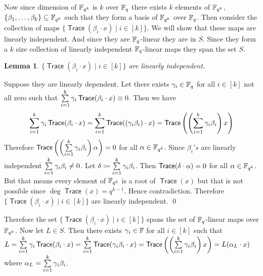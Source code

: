 \documentclass[a4paper, 11pt]{article}
\newtheorem{lemma}{Lemma}
\renewenvironment{proof}{\noindent{\it \textbf{Proof:}}\hspace*{1em}}{\qed\bigskip\\}
\DeclareMathOperator{\trac}{\textsf{Trace}}
\begin{document}
{\begin{enumerate}[label=(\alph*)]
Now since dimension of $\mathbb{F}_{q^k}$ is $k$ over $\mathbb{F}_q$ there exists $k $ elements of $\mathbb{F}_{q^k}$, $\{\beta_1,\dots, \beta_k\}\subseteq \mathbb{F}_{q^k}$ such that they form a basis of $\mathbb{F}_{q^k}$ over $\mathbb{F}_{q}$. Then consider the collection of maps $\{\trac(\beta_i\cdot x)\mid i\in[k]\}$. We will show that these maps are linearly independent. And since they are $\mathbb{F}_q$-linear they are in $S$. Since they form a $k$ size collection of linearly independent $\mathbb{F}_q$-linear maps they span the set $S$.
\begin{lemma}
	$\{\trac(\beta_i\cdot x)\mid i\in[k]\}$ are linearly independent.
\end{lemma}
\begin{proof}
	Suppose they are linearly dependent. Let there exists $\gamma_i\in\mathbb{F}_q$ for all $i\in[k]$ not all zero such that $\sum\limits_{i=1}^k\gm_i\trac(\beta_i\cdot x)\equiv 0$. Then we have $$\sum\limits_{i=1}^k\gm_i\trac(\beta_i\cdot x)=\sum_{i=1}^k\trac((\gm_i\beta_i)\cdot x)=\trac\lt(\lt(\sum_{i=1}^k\gm_i\beta_i\rt)x\rt)$$Therefore $\trac\lt(\lt(\sum\limits_{i=1}^k\gm_i\beta_i\rt)\alpha\rt)=0$ for all $\alpha\in\mathbb{F}_{q^k}$. Since $\beta_i's$ are linearly independent $\sum\limits_{i=1}^k\gamma_i\beta_i\neq 0$. Let $\delta\coloneqq \sum\limits_{i=1}^k\gamma_i\beta_i$. Then $\trac(\dl\cdot \alpha)= 0$ for all $\alpha\in\mathbb{F}_{q^k}$. But that means every element of $\mathbb{F}_{q^k}$ is a root of $\trac(x)$ but that is not possible since $\deg\trac(x)=q^{k-1}$. Hence contradiction. Therefore $\{\trac(\beta_i\cdot x)\mid i\in[k]\}$ are linearly independent.
\end{proof}

Therefore the set $\{\trac(\beta_i\cdot x)\mid i\in[k]\}$ spans the set of $\mathbb{F}_q$-linear maps over $\mathbb{F}_{q^k}$. Now let $L\in S$. Then there exists $\gamma_i\in\mathbb{F}$ for all $i\in[k]$ such that $L=\sum\limits_{i=1}^k \gm_i\trac(\beta_i\cdot x)=\sum\limits_{i=1}^k \trac(\gm_i\beta_i\cdot x)=\trac\lt(\lt(\sum\limits_{i=1}^k \gm_i\beta_i\rt)x\rt)=L(\alpha_L\cdot x)$ where $\alpha_L=\sum\limits_{i=1}^k \gamma_i\beta_i$.
\end{enumerate}
}

\end{document}
